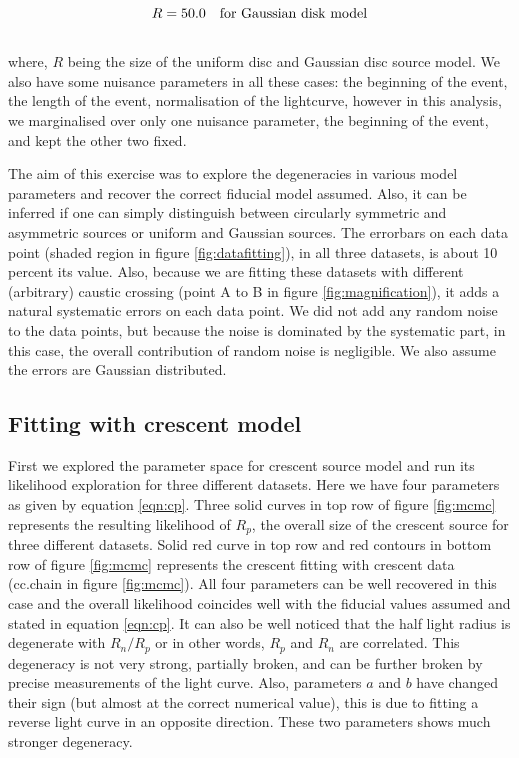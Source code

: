 \begin{equation}
	R = 50.0 \ \ \ \rm{for\ Gaussian\ disk\ model}
\end{equation}
\\
where, $R$ being the size of the uniform disc and Gaussian disc source model. We also have some nuisance parameters in all these cases: the beginning of the event, the length of the event, normalisation of the lightcurve, however in this analysis, we marginalised over only one nuisance parameter, the beginning of the event, and kept the other two fixed.

The aim of this exercise was to explore the degeneracies in  various model parameters and recover the correct fiducial model assumed. Also, it can be inferred if one can simply distinguish between circularly symmetric and asymmetric sources or uniform and Gaussian sources.
The errorbars on each data point (shaded region in figure \ref{fig:datafitting}), in all three datasets, is about 10 percent its value. Also, because we are fitting these datasets with different (arbitrary) caustic crossing (point A to B in figure \ref{fig:magnification}), it adds a natural systematic errors on each data point. We did not add any random noise to the data points, but because the noise is dominated by the systematic part, in this case, the overall contribution of random noise is negligible. We also assume the errors are Gaussian distributed.


\subsection{Fitting with crescent model}
First we explored the parameter space for crescent source model and run its likelihood exploration for three different datasets. Here we have four parameters as given by equation \ref{eqn:cp}. Three solid curves in top row of figure \ref{fig:mcmc} represents the resulting likelihood of $R_p$, the overall size of the crescent source for three different datasets. Solid red curve in top row and red contours in bottom row of figure \ref{fig:mcmc} represents the crescent fitting with crescent data (cc.chain in figure \ref{fig:mcmc}). All four parameters can be well recovered in this case and the overall likelihood coincides well with the fiducial values assumed and stated in equation \ref{eqn:cp}. It can also be well noticed that the half light radius is degenerate with $R_n/R_p$ or in other words, $R_p$ and $R_n$ are correlated. This degeneracy is not very strong, partially broken, and can be further broken by precise measurements of the light curve. Also, parameters $a$ and $b$ have changed their sign (but almost at the correct numerical value), this is due to fitting a reverse light curve in an opposite direction. These two parameters shows much stronger degeneracy.

